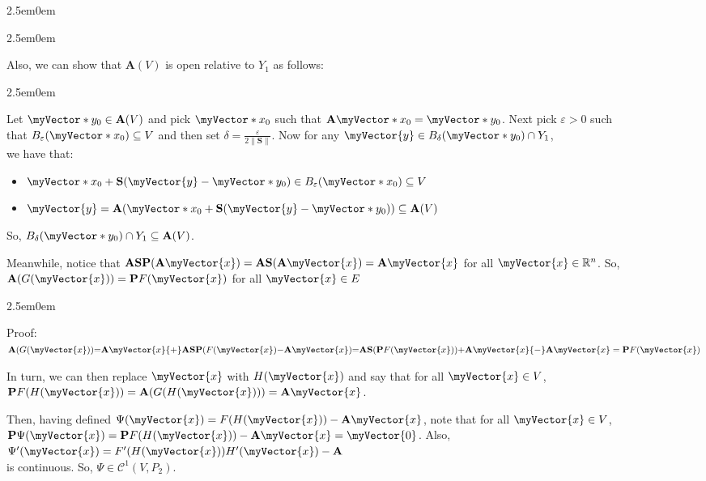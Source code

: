 \documentclass{book}
\newcommand{\hFour}{%
   \color{Cerulean}
   \fontsize{12}{14}\selectfont%
}
\newenvironment{myIndent}{%
   \begin{adjustwidth}{2.5em}{0em}%
}{%
   \end{adjustwidth}%
}
\newcommand{\retTwo}{\hfill\bigbreak}
\newcommand{\mVec}[1]{\myVector{#1}}
\newcommand{\mVecAst}[1]{\myVector*{#1}}
\newcommand{\mMat}[1]{\mathbf{#1}}
\begin{document}
{\begin{myIndent}
{\begin{myIndent}
      Also, we can show that $\mMat{A}(V)$ is open relative to $Y_1$ as follows:
      {\begin{myIndent}\hFour
         Let $\mVecAst{y}_0 \in \mMat{A}(V)$ and pick $\mVecAst{x}_0$ such that $\mMat{A}\mVecAst{x}_0 = \mVecAst{y}_0$. Next pick $\varepsilon > 0$ such\\ [2pt] that $B_\varepsilon(\mVecAst{x}_0) \subseteq V$ and then set $\delta = \frac{\varepsilon}{2\|\mMat{S}\|}$. Now for any $\mVec{y} \in B_\delta(\mVecAst{y}_0) \cap Y_1$,\\ we have that:
         \begin{itemize}
            \item $\mVecAst{x}_0 + \mMat{S}(\mVec{y} - \mVecAst{y}_0) \in B_\varepsilon(\mVecAst{x}_0) \subseteq V$
            \item $\mVec{y} = \mMat{A}(\mVecAst{x}_0 + \mMat{S}(\mVec{y} - \mVecAst{y}_0)) \subseteq \mMat{A}(V)$\retTwo
         \end{itemize}

         So, $B_\delta(\mVecAst{y}_0) \cap Y_1 \subseteq \mMat{A}(V)$.\retTwo
      \end{myIndent}}

      Meanwhile, notice that $\mMat{ASP}(\mMat{A}\mVec{x}) = \mMat{AS}(\mMat{A}\mVec{x}) = \mMat{A}\mVec{x}$ for all $\mVec{x} \in \mathbb{R}^n$. So,\\ $\mMat{A}(G(\mVec{x})) = \mMat{P}F(\mVec{x})$ for all $\mVec{x} \in E$ 
      
      {\begin{myIndent}\hFour
         Proof:\\
         $\mMat{A}(G(\mVec{x})) {=} \mMat{A}\mVec{x} {+} \mMat{ASP}(F(\mVec{x}) {-} \mMat{A}\mVec{x}) {=} \mMat{AS}(\mMat{P}F(\mVec{x})) {+} \mMat{A}\mVec{x} {-} \mMat{A}{\mVec{x}} = \mMat{P}F(\mVec{x})$\retTwo
      \end{myIndent}}

      In turn, we can then replace $\mVec{x}$ with $H(\mVec{x})$ and say that for all $\mVec{x} \in V$,\\ $\mMat{P}F(H(\mVec{x})) = \mMat{A}(G(H(\mVec{x}))) = \mMat{A}\mVec{x}$.\retTwo
      
      Then, having defined $\Psi(\mVec{x}) = F(H(\mVec{x})) - \mMat{A}\mVec{x}$, note that for all $\mVec{x} \in V$,\\ $\mMat{P} \Psi(\mVec{x}) = \mMat{P}F(H(\mVec{x})) - \mMat{A}\mVec{x} = \mVec{0}$. Also, $\Psi^\prime(\mVec{x}) = F^\prime(H(\mVec{x}))H^\prime(\mVec{x}) - \mMat{A}$\\ is continuous. So, $\Psi \in \mathscr{C}^1(V, P_2)$.\\ [8pt]


\end{myIndent}}
\end{myIndent}}
\end{document}
